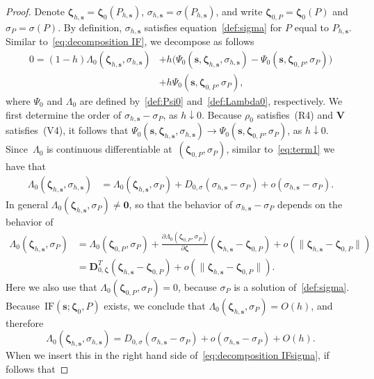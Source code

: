 \documentclass{article}
\numberwithin{equation}{section}
\theoremstyle{plain}
\newcommand{\bzeta}{\bm\zeta}
\newcommand{\bs}{\mathbf{s}}
\newcommand{\bV}{\mathbf{V}}
\newcommand{\bD}{\mathbf{D}}
\begin{document}
\begin{proof}
Denote $\bzeta_{h,\bs}=\bzeta_0(P_{h,\bs})$, $\sigma_{h,\bs}=\sigma(P_{h,\bs})$,
and write $\bzeta_{0,P}=\bzeta_0(P)$ and $\sigma_P=\sigma(P)$.
By definition, $\sigma_{h,\bs}$ satisfies equation~\eqref{def:sigma}  for $P$ equal to $P_{h,\bs}$.
Similar to~\eqref{eq:decomposition IF}, we decompose as follows
\begin{equation}
\label{eq:decomposition IFsigma}
\begin{split}
0
=
(1-h)
\Lambda_0(\bzeta_{h,\bs},\sigma_{h,\bs})
&+
h\Big(
\Psi_0(\bs,\bzeta_{h,\bs},\sigma_{h,\bs})-\Psi_0(\bs,\bzeta_{0,P},\sigma_P)
\Big)\\
&+
h\Psi_0(\bs,\bzeta_{0,P},\sigma_P),
\end{split}
\end{equation}
where $\Psi_0$ and $\Lambda_0$ are defined by~\eqref{def:Psi0} and~\eqref{def:Lambda0}, respectively.
We first determine the order of $\sigma_{h,\bs}-\sigma_P$, as $h\downarrow0$.
Because $\rho_0$ satisfies~(R4) and $\bV$ satisfies~(V4), it follows that
$\Psi_0(\bs,\bzeta_{h,\bs},\sigma_{h,\bs})\to\Psi_0(\bs,\bzeta_{0,P},\sigma_P)$, as $h\downarrow0$.
Since~$\Lambda_0$ is continuous differentiable at~$(\bzeta_{0,P},\sigma_P)$,
similar to~\eqref{eq:term1} 
we have that
\[
\begin{split}
\Lambda_0(\bzeta_{h,\bs},\sigma_{h,\bs})
&=
\Lambda_0(\bzeta_{h,\bs},\sigma_P)
+
D_{0,\sigma}
(\sigma_{h,\bs}-\sigma_P)+
o(\sigma_{h,\bs}-\sigma_P).
\end{split}
\]
In general $\Lambda_0(\bzeta_{h,\bs},\sigma_P)\ne \mathbf{0}$, so that the behavior of $\sigma_{h,\bs}-\sigma_P$
depends on the behavior of
\[
\begin{split}
\Lambda_0(\bzeta_{h,\bs},\sigma_P)
&=
\Lambda_0(\bzeta_{0,P},\sigma_P)
+
\frac{\partial\Lambda_0(\bzeta_{0,P},\sigma_P)}{\partial\bzeta}
(\bzeta_{h,\bs}-\bzeta_{0,P})
+
o(\|\bzeta_{h,\bs}-\bzeta_{0,P}\|)\\
&=
\bD_{0,\bzeta}^T
(\bzeta_{h,\bs}-\bzeta_{0,P})
+
o(\|\bzeta_{h,\bs}-\bzeta_{0,P}\|).
\end{split}
\]
Here we also use that $\Lambda_0(\bzeta_{0,P},\sigma_P)=0$, because $\sigma_P$ is a solution of~\eqref{def:sigma}.
Because~$\text{IF}(\bs;\bzeta_0,P)$ exists, we conclude that
$\Lambda_0(\bzeta_{h,\bs},\sigma_P)=O(h)$, and therefore 
\[
\Lambda_0(\bzeta_{h,\bs},\sigma_{h,\bs})
=
D_{0,\sigma}
(\sigma_{h,\bs}-\sigma_P)+
o(\sigma_{h,\bs}-\sigma_P)
+O(h).
\]
When we insert this in the right hand side of~\eqref{eq:decomposition IFsigma}, if follows that

\end{proof}
\end{document}
